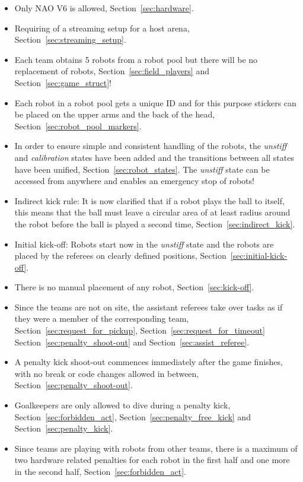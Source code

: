 \begin{itemize}
\item Only NAO V6 is allowed, \cf Section~\ref{sec:hardware}.
\item Requiring of a streaming setup for a host arena, \cf Section~\ref{sec:streaming_setup}.
\item Each team obtains 5 robots from a robot pool but there will be no replacement of robots, \cf Section~\ref{sec:field_players} and Section~\ref{sec:game_struct}! 
\item Each robot in a robot pool gets a unique ID and for this purpose stickers can be placed on the upper arms and the back of the head, \cf Section~\ref{sec:robot_pool_markers}.
\item In order to ensure simple and consistent handling of the robots, the \textit{unstiff} and \textit{calibration} states have been added and the transitions between all states have been unified, \cf Section~\ref{sec:robot_states}. The \textit{unstiff} state can be accessed from anywhere and enables an emergency stop of robots!
\item Indirect kick rule: It is now clarified that if a robot plays the ball to itself, this means that the ball must leave a circular area of at least \FreeKickRadius radius around the robot before the ball is played a second time, \cf Section~\ref{sec:indirect_kick}.
\item Initial kick-off: Robots start now in the \textit{unstiff} state and the robots are placed by the referees on clearly defined positions, \cf Section~\ref{sec:initial-kick-off}.
\item There is no manual placement of any robot, \cf Section~\ref{sec:kick-off}.
\item Since the teams are not on site, the assistant referees take over tasks as if they were a member of the corresponding team, \cf Section~\ref{sec:request_for_pickup}, Section~\ref{sec:request_for_timeout} Section~\ref{sec:penalty_shoot-out} and Section~\ref{sec:assist_referee}.
\item A penalty kick shoot-out commences immediately after the game finishes, with no break or code changes allowed in between, \cf Section~\ref{sec:penalty_shoot-out}.
\item Goalkeepers are only allowed to dive during a penalty kick, \cf Section~\ref{sec:forbidden_act}, Section~\ref{sec:penalty_free_kick} and Section~\ref{sec:penalty_kick}.
\item Since teams are playing with robots from other teams, there is a maximum of two hardware related penalties for each robot in the first half and one more in the second half, \cf Section~\ref{sec:forbidden_act}.

\end{itemize}
